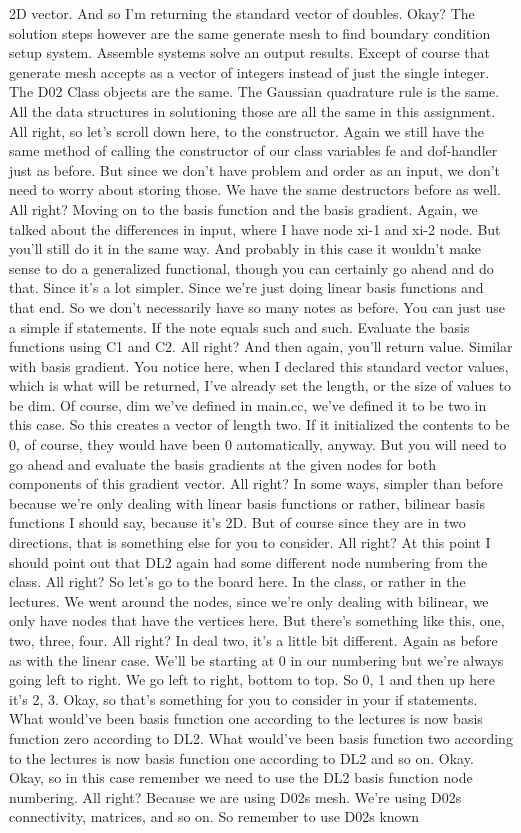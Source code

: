 \documentclass[10pt]{article}
\begin{document}
2D vector. And so I'm returning the standard vector of doubles. Okay? The solution steps however are the same generate mesh to find boundary condition setup system. Assemble systems solve an output results. Except of course that generate mesh accepts as a vector of integers instead of just the single integer. The D02 Class objects are the same. The Gaussian quadrature rule is the same. All the data structures in solutioning those are all the same in this assignment. All right, so let's scroll down here, to the constructor. Again we still have the same method of calling the constructor of our class variables fe and dof-handler just as before. But since we don't have problem and order as an input, we don't need to worry about storing those. We have the same destructors before as well. All right? Moving on to the basis function and the basis gradient. Again, we talked about the differences in input, where I have node xi-1 and xi-2 node. But you'll still do it in the same way. And probably in this case it wouldn't make sense to do a generalized functional, though you can certainly go ahead and do that. Since it's a lot simpler. Since we're just doing linear basis functions and that end. So we don't necessarily have so many notes as before. You can just use a simple if statements. If the note equals such and such. Evaluate the basis functions using C1 and C2. All right? And then again, you'll return value. Similar with basis gradient. You notice here, when I declared this standard vector values, which is what will be returned, I've already set the length, or the size of values to be dim. Of course, dim we've defined in main.cc, we've defined it to be two in this case. So this creates a vector of length two. If it initialized the contents to be 0, of course, they would have been 0 automatically, anyway. But you will need to go ahead and evaluate the basis gradients at the given nodes for both components of this gradient vector. All right? In some ways, simpler than before because we're only dealing with linear basis functions or rather, bilinear basis functions I should say, because it's 2D. But of course since they are in two directions, that is something else for you to consider. All right? At this point I should point out that DL2 again had some different node numbering from the class. All right? So let's go to the board here. In the class, or rather in the lectures.  We went around the nodes, since we're only dealing with bilinear, we only have nodes that have the vertices here. But there's something like this, one, two, three, four. All right? In deal two, it's a little bit different. Again as before as with the linear case. We'll be starting at 0 in our numbering but we're always going left to right. We go left to right, bottom to top. So 0, 1 and then up here it's 2, 3. Okay, so that's something for you to consider in your if statements. What would've been basis function one according to the lectures is now basis function zero according to DL2. What would've been basis function two according to the lectures is now basis function one according to DL2 and so on. Okay. Okay, so in this case remember we need to use the DL2 basis function node numbering. All right? Because we are using D02s mesh. We're using D02s connectivity, matrices, and so on. So remember to use D02s known 
\end{document}
